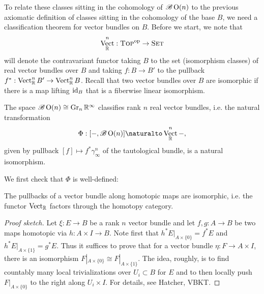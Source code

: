 \documentclass{amsart}
\DeclareMathOperator{\Vect}{Vect}
\begin{document}
To relate these classes sitting in the cohomology of $\mathscr{B}\operatorname{O}(n)$ to the previous
axiomatic definition of classes sitting in the cohomology of the base $B$, we need a classification
theorem for vector bundles on $B$.
Before we start, we note that
\begin{equation*}
    \Vect_\R^n:\textsc{Top}^\mathrm{op}\to\textsc{Set}
\end{equation*}
will denote the contravariant functor taking $B$ to the set (isomorphism classes) of real vector bundles
over $B$ and taking $f:B\to B'$ to the pullback $f^*:\Vect_\R^n B'\to \Vect_\R^n B$. Recall that two
vector bundles over $B$ are isomorphic if there is a map lifting $\operatorname{id}_B$ that is a fiberwise linear
isomorphism.

\begin{theorem}
    The space $\mathscr{B}\operatorname{O}(n)\cong\operatorname{Gr}_n\mathbb{R}^\infty$ classifies rank $n$ real vector bundles, i.e. the natural
    transformation
    \begin{equation*}
        \Phi: [-,\mathscr{B}\OO(n)] \naturalto \Vect_\R^n-,
    \end{equation*}
    given by pullback $[f]\mapsto f^*\gamma^n_\infty$ of the tautological bundle, is a natural isomorphism.
    \label{class}
\end{theorem}

We first check that $\Phi$ is well-defined:
\begin{lemma}
    The pullbacks of a vector bundle along homotopic maps are isomorphic, i.e.  the functor $\Vect_\R$ factors
    through the homotopy category.
\end{lemma}
\begin{proof}[Proof sketch]
    Let $\xi:E\to B$ be a rank $n$ vector bundle and let $f,g:A\to B$ be two maps homotopic via
    $h:A\times I\to B$. Note first that $h^*E|_{A\times\{0\}}=f^*E$ and $h^*E|_{A\times\{1\}}=g^*E$.
    Thus it suffices to prove that for a vector bundle $\eta:F\to A\times I$, there is an isomorphism
    $F|_{A\times\{0\}}\cong F|_{A\times\{1\}}$. The idea, roughly, is to find countably many local
    trivializations over $U_i\subset B$ for $E$ and to then locally push
    $F|_{A\times\{0\}}$ to the right along $U_i\times I$. For details, see {\color{magenta}Hatcher, VBKT}.
\end{proof}
\end{document}
